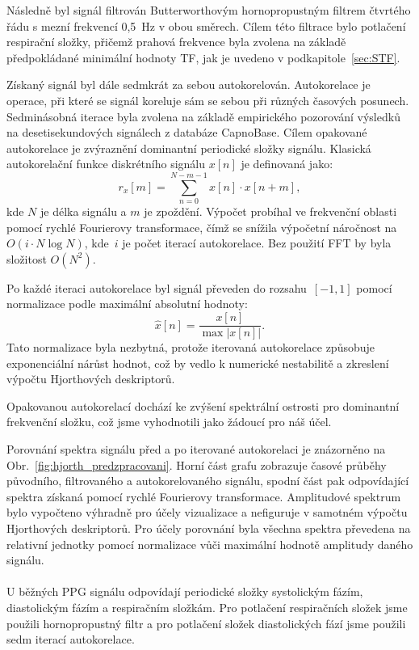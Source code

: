 Následně byl signál filtrován Butterworthovým hornopropustným filtrem čtvrtého řádu s mezní frekvencí 0,5~Hz v obou směrech.
Cílem této filtrace bylo potlačení respirační složky, přičemž prahová frekvence byla zvolena na základě předpokládané minimální hodnoty \acs{TF}, jak je uvedeno v podkapitole~\ref{sec:STF}.

Získaný signál byl dále sedmkrát za sebou autokorelován.
Autokorelace je operace, při které se signál koreluje sám se sebou při různých časových posunech.
Sedminásobná iterace byla zvolena na základě empirického pozorování výsledků na desetisekundových signálech z databáze CapnoBase.
Cílem opakované autokorelace je zvýraznění dominantní periodické složky signálu.
Klasická autokorelační funkce diskrétního signálu \( x[n] \) je definovaná jako:
\begin{equation}
	r_x[m] = \sum_{n=0}^{N-m-1} x[n] \cdot x[n+m],
\end{equation}
kde \( N \) je délka signálu a \( m \) je zpoždění.
Výpočet probíhal ve frekvenční oblasti pomocí rychlé Fourierovy transformace, čímž se snížila výpočetní náročnost na~\(O(i \cdot N \log N)\), kde~\(i\) je počet iterací autokorelace.
Bez použití \acs{FFT} by byla složitost \(O(N^2)\).

Po každé iteraci autokorelace byl signál převeden do rozsahu~\([-1, 1]\) pomocí normalizace podle maximální absolutní hodnoty:
\begin{equation}
	\hat{x}[n] = \frac{x[n]}{\max |x[n]|}.
\end{equation}
Tato normalizace byla nezbytná, protože iterovaná autokorelace způsobuje exponenciální nárůst hodnot, což by vedlo k numerické nestabilitě a zkreslení výpočtu Hjorthových deskriptorů.

Opakovanou autokorelací dochází ke zvýšení spektrální ostrosti pro dominantní frekvenční složku, což jsme vyhodnotili jako žádoucí pro náš účel.

Porovnání spektra signálu před a po iterované autokorelaci je znázorněno na Obr.~\ref{fig:hjorth_predzpracovani}.
Horní část grafu zobrazuje časové průběhy původního, filtrovaného a autokorelovaného signálu, spodní část pak odpovídající spektra získaná pomocí rychlé Fourierovy transformace.
Amplitudové spektrum bylo vypočteno výhradně pro účely vizualizace a nefiguruje v samotném výpočtu Hjorthových deskriptorů.
Pro účely porovnání byla všechna spektra převedena na relativní jednotky pomocí normalizace vůči maximální hodnotě amplitudy daného signálu.

\paragraph{}
U běžných \acs{PPG} signálu odpovídají periodické složky systolickým fázím, diastolickým fázím a respiračním složkám.
Pro potlačení respiračních složek jsme použili hornopropustný filtr a pro potlačení složek diastolických fází jsme použili sedm iterací autokorelace.

